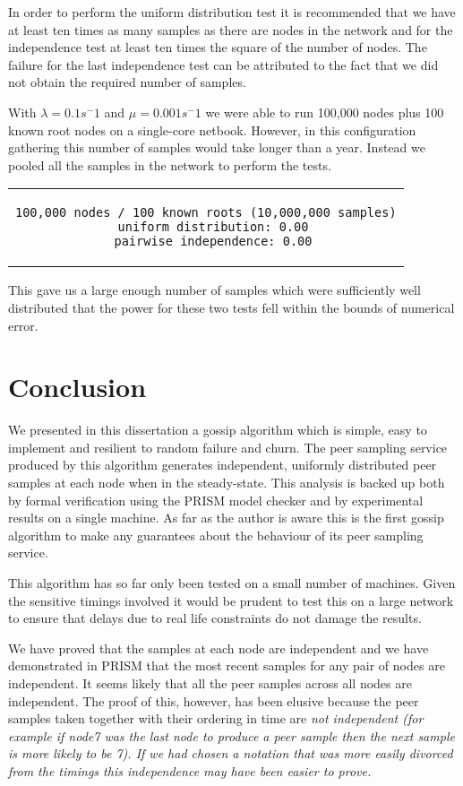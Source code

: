 \documentclass[a4paper,10pt]{article}
\newenvironment{prismprop}[0]{
  \begin{center}
  \begin{tabular}{c}
  \footnotesize
}{
  \end{tabular}
  \end{center}
}
\begin{document}
In order to perform the uniform distribution test it is recommended that we have at least ten times as many samples as there are nodes in the network and for the independence test at least ten times the square of the number of nodes. The failure for the last independence test can be attributed to the fact that we did not obtain the required number of samples.

With $\lambda=0.1 s^-1$ and $\mu=0.001 s^-1$ we were able to run 100,000 nodes plus 100 known root nodes on a single-core netbook. However, in this configuration gathering this number of samples would take longer than a year. Instead we pooled all the samples in the network to perform the tests.

\begin{prismprop}
\begin{lstlisting}
100,000 nodes / 100 known roots (10,000,000 samples)
  uniform distribution: 0.00
  pairwise independence: 0.00
\end{lstlisting}
\end{prismprop}

This gave us a large enough number of samples which were sufficiently well distributed that the power for these two tests fell within the bounds of numerical error.

\section{Conclusion}

We presented in this dissertation a gossip algorithm which is simple, easy to implement and resilient to random failure and churn. The peer sampling service produced by this algorithm generates independent, uniformly distributed peer samples at each node when in the steady-state. This analysis is backed up both by formal verification using the PRISM model checker and by experimental results on a single machine. As far as the author is aware this is the first gossip algorithm to make any guarantees about the behaviour of its peer sampling service.

This algorithm has so far only been tested on a small number of machines. Given the sensitive timings involved it would be prudent to test this on a large network to ensure that delays due to real life constraints do not damage the results.

We have proved that the samples at each node are independent and we have demonstrated in PRISM that the most recent samples for any pair of nodes are independent. It seems likely that all the peer samples across all nodes are independent. The proof of this, however, has been elusive because the peer samples taken together with their ordering in time are \em not \em independent (for example if node7 was the last node to produce a peer sample then the next sample is more likely to be 7). If we had chosen a notation that was more easily divorced from the timings this independence may have been easier to prove.
\end{document}
